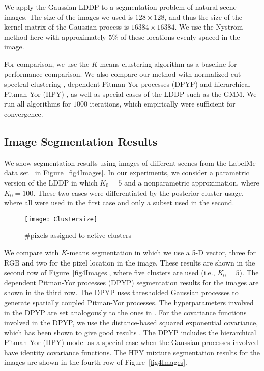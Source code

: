 \documentclass[runningheads,a4paper]{iscide}
\begin{document}
We apply the Gaussian LDDP to a segmentation problem of natural scene images. The size of the images we used is $128\times 128$, and thus the size of the kernel matrix
of the Gaussian process is $16384 \times 16384$. We use the Nystr\"{o}m method here with approximately $5\%$ of these locations evenly spaced in the image.

For comparison, we use the $K$-means clustering algorithm as a baseline for performance
comparison. We also compare our method with normalized cut spectral clustering \cite{Shi00NC}, dependent Pitman-Yor processes (DPYP) \cite{Sudderth08SS} and hierarchical Pitman-Yor (HPY) \cite{HPY}, as well as special cases of the LDDP such as the GMM. We run all algorithms for $1000$ iterations, which empirically were sufficient for convergence.

\subsection{Image Segmentation Results}
We show segmentation results using images of different scenes from the LabelMe data set~\cite{Uetz09LSOB} in Figure~\ref{fig4Images}. In our experiments, we consider a parametric version of the LDDP in which $K_0 = 5$ and a nonparametric approximation, where $K_0 = 100$. These two cases were differentiated by the posterior cluster usage, where all were used in the first case and only a subset used in the second.

\begin{wrapfigure}{r}{0.5\textwidth}\vspace{-20pt}
  \centering
  \texttt{[image: Clustersize]}%
  \caption{\#pixels assigned to active clusters}
  \label{figClustersize}\vspace{-10pt}
\end{wrapfigure}

We compare with $K$-means segmentation in which we use a 5-D vector, three for RGB and two for the pixel location in the image. These results are shown in the second row of Figure~\ref{fig4Images}, where five clusters are used (i.e., $K_0=5$). The dependent Pitman-Yor processes (DPYP) segmentation results for the  images are shown in the third row. The DPYP uses thresholded Gaussian processes to generate spatially coupled Pitman-Yor processes. The hyperparameters involved in the DPYP are set analogously to the  ones in \cite{Sudderth08SS}.  For the covariance functions involved in the DPYP, we use the distance-based squared exponential covariance, which has been shown to give good results \cite{Sudderth08SS}.
The DPYP includes the hierarchical Pitman-Yor (HPY) model as a special case when the Gaussian processes involved have identity covariance functions. The HPY mixture segmentation results for the  images are shown in the fourth row of Figure~\ref{fig4Images}.
\end{document}
